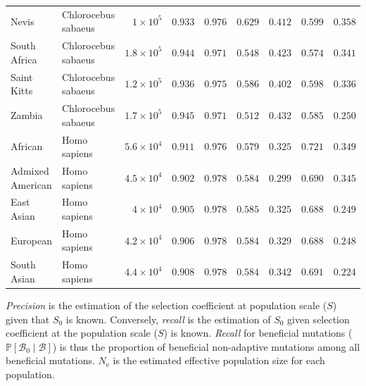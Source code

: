 \documentclass[10pt,letterpaper]{article}
\newcommand{\Ne}{N_{\text{e}}}
\newcommand{\proba}{\mathbb{P}}
\newcommand{\Sphy}{S_{0}}
\newcommand{\SphyBen}{\mathcal{B}_0}
\newcommand{\given}{\mid}
\newcommand{\Spop}{S}
\newcommand{\SpopBen}{\mathcal{B}}
\begin{document}
\begin{table}[!ht]
\begin{adjustwidth}{-2.25in}{0in}
\begin{tabular}{||l|l|r||r|r||r|r||r|r||}
\rowcolor{LIGHTGREY} Nevis & Chlorocebus sabaeus & $ 1\times 10^{5}$ & $ 0.933$ & $ 0.976$ & $ 0.629$ & $ 0.412$ & $ 0.599$ & $ 0.358$ \\
\rowcolor{LIGHTGREY} South Africa & Chlorocebus sabaeus & $1.8\times 10^{5}$ & $ 0.944$ & $ 0.971$ & $ 0.548$ & $ 0.423$ & $ 0.574$ & $ 0.341$ \\
\rowcolor{LIGHTGREY} Saint Kitts & Chlorocebus sabaeus & $1.2\times 10^{5}$ & $ 0.936$ & $ 0.975$ & $ 0.586$ & $ 0.402$ & $ 0.598$ & $ 0.336$ \\
\rowcolor{LIGHTGREY} Zambia & Chlorocebus sabaeus & $1.7\times 10^{5}$ & $ 0.945$ & $ 0.971$ & $ 0.512$ & $ 0.432$ & $ 0.585$ & $ 0.250$ \\
African & Homo sapiens & $5.6\times 10^{4}$ & $ 0.911$ & $ 0.976$ & $ 0.579$ & $ 0.325$ & $ 0.721$ & $ 0.349$ \\
Admixed American & Homo sapiens & $4.5\times 10^{4}$ & $ 0.902$ & $ 0.978$ & $ 0.584$ & $ 0.299$ & $ 0.690$ & $ 0.345$ \\
East Asian & Homo sapiens & $ 4\times 10^{4}$ & $ 0.905$ & $ 0.978$ & $ 0.585$ & $ 0.325$ & $ 0.688$ & $ 0.249$ \\
European & Homo sapiens & $4.2\times 10^{4}$ & $ 0.906$ & $ 0.978$ & $ 0.584$ & $ 0.329$ & $ 0.688$ & $ 0.248$ \\
South Asian & Homo sapiens & $4.4\times 10^{4}$ & $ 0.908$ & $ 0.978$ & $ 0.584$ & $ 0.342$ & $ 0.691$ & $ 0.224$ \\
\bottomrule
\end{tabular}
\normalsize
\begin{flushleft} \textit{Precision} is the estimation of the selection coefficient at population scale ($\Spop$) given that $\Sphy$ is known.
Conversely, \textit{recall} is the estimation of $\Sphy$ given selection coefficient at the population scale ($\Spop$) is known.
\textit{Recall} for beneficial mutations ($\proba [\SphyBen \given \SpopBen]$) is thus the proportion of beneficial non-adaptive mutations among all beneficial mutations.
$\Ne$ is the estimated effective population size for each population.
\end{flushleft}
\label{table:proba}
\end{adjustwidth}
\end{table}
\end{document}
